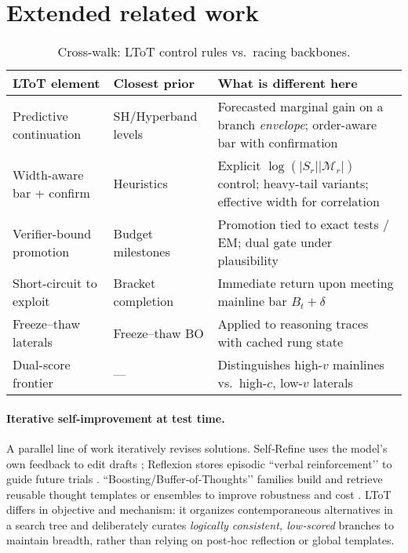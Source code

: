 \documentclass{article}
\begin{document}
\section{Extended related work}\label{app:extended-rw}
\begin{table}[t]
\centering
\small
\begin{tabular}{@{}p{2.9cm}p{3.0cm}p{6.7cm}@{}}
\toprule
\textbf{LToT element} & \textbf{Closest prior} & \textbf{What is different here} \\
\midrule
Predictive continuation & SH/Hyperband levels & Forecasted marginal gain on a branch \emph{envelope}; order-aware bar with confirmation \\
Width-aware bar + confirm & Heuristics & Explicit $\log(|S_r||\mathcal{M}_r|)$ control; heavy-tail variants; effective width for correlation \\
Verifier-bound promotion & Budget milestones & Promotion tied to exact tests / EM; dual gate under plausibility \\
Short-circuit to exploit & Bracket completion & Immediate return upon meeting mainline bar $B_t+\delta$ \\
Freeze--thaw laterals & Freeze--thaw BO & Applied to reasoning traces with cached rung state \\
Dual-score frontier & --- & Distinguishes high-$v$ mainlines vs.\ high-$c$, low-$v$ laterals \\
\bottomrule
\end{tabular}
\caption{Cross-walk: LToT control rules vs.\ racing backbones.}
\end{table}

\paragraph{Iterative self‑improvement at test time.}
A parallel line of work iteratively revises solutions. Self‑Refine uses the model’s own feedback to edit drafts \citep{madaan2023selfrefine}; Reflexion stores episodic “verbal reinforcement’’ to guide future trials \citep{shinn2023reflexion}. “Boosting/Buffer‑of‑Thoughts’’ families build and retrieve reusable thought templates or ensembles to improve robustness and cost \citep{chen2024bot,yang2024bot}. LToT differs in objective and mechanism: it organizes contemporaneous alternatives in a search tree and deliberately curates \emph{logically consistent, low‑scored} branches to maintain breadth, rather than relying on post‑hoc reflection or global templates.
\end{document}
